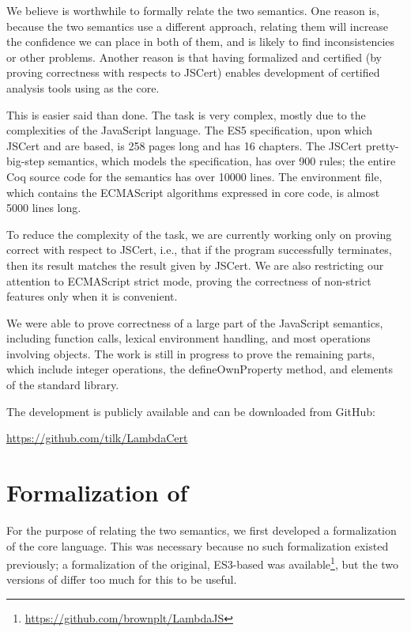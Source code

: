 \documentclass{sigplanconf}
\begin{document}
We believe is worthwhile to formally relate the two semantics. One reason is,
because the two semantics use a different approach, relating
them will increase the confidence we can place in both of them,
and is likely to find inconsistencies or other problems. Another reason is
that having \lambdajs{} formalized and certified (by proving correctness
with respects to JSCert) enables development of certified analysis tools
using \lambdajs{} as the core.

This is easier said than done. The task is very complex, mostly due
to the complexities of the JavaScript language. The ES5 specification,
upon which JSCert and \lambdajs{} are based, is 258 pages long and 
has 16 chapters. The JSCert pretty-big-step semantics, which models
the specification, has over 900 rules; the entire Coq source code
for the semantics has over 10000 lines. The \lambdajs{} environment
file, which contains the ECMAScript algorithms expressed in core
\lambdajs{} code, is almost 5000 lines long.

To reduce the complexity of the task, we are currently working
only on proving \lambdajs{} correct with respect to JSCert,
i.e., that if the \lambdajs{} program successfully terminates,
then its result matches the result given by JSCert. We are also
restricting our attention to ECMAScript strict mode, proving the
correctness of non-strict features only when it is convenient.

We were able to prove correctness of a large part of the
JavaScript semantics, including function calls, lexical environment
handling, and most operations involving objects. The work is still
in progress to prove the remaining parts, which include integer
operations, the
defineOwnProperty method, and elements of the standard library.

The development is publicly available and can be downloaded from GitHub:

\url{https://github.com/tilk/LambdaCert}

\section{Formalization of \lambdajs{}}

For the purpose of relating the two semantics, we first
developed a formalization of the \lambdajs{} core language.
This was necessary because no such formalization existed previously;
a formalization of the original, ES3-based \lambdajs{}
was available\footnote{\url{https://github.com/brownplt/LambdaJS}},
but the two versions of \lambdajs{} differ too much for this
to be useful.
\end{document}

